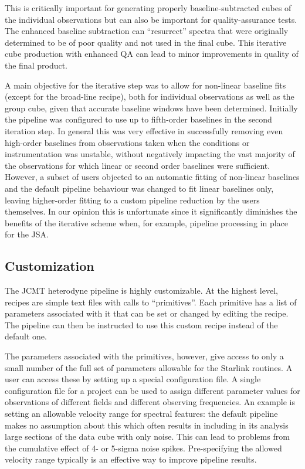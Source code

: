 \documentclass[useAMS,usenatbib]{mn2e}
\begin{document}
This is critically important for generating properly baseline-subtracted
cubes of the individual observations but can also
be important for quality-assurance tests. The enhanced baseline
subtraction can ``resurrect'' spectra that were originally determined
to be of poor quality and not used in the final cube. This iterative
cube production with enhanced QA can lead to minor improvements in
quality of the final product.

A main objective for the iterative step was to allow for non-linear baseline fits
(except for the broad-line recipe), both for individual observations as well as
the group cube, given that accurate baseline windows have been determined.
Initially the pipeline was configured to use up to fifth-order baselines in
the second iteration step. In general this was very effective in successfully
removing even high-order baselines from observations taken when the
conditions or instrumentation was unstable, without negatively impacting
the vast majority of the observations for which linear or second order baselines
were sufficient.  However, a subset of users objected to an automatic fitting of
non-linear baselines and the default pipeline behaviour was changed to
fit linear baselines only, leaving higher-order fitting to a custom pipeline reduction
by the users themselves.  In our opinion this is unfortunate since it significantly
diminishes the benefits of the iterative scheme when, for example, pipeline processing
in place for the JSA.

\subsection{Customization}

The JCMT heterodyne pipeline is highly customizable. At the highest level, recipes
are simple text files with calls to ``primitives''. Each primitive has a list of
parameters associated with it that can be set or changed by editing the recipe.
The pipeline can then be instructed to use this custom recipe instead of the default one.

The parameters associated with the primitives, however, give access to only a small
number of the full set of parameters allowable for the Starlink routines. A user can access
these by setting up a special configuration file. A single configuration file for a project can
be used to assign different parameter values for observations of different fields and
different observing frequencies. An example is setting an allowable velocity range for
spectral features: the default pipeline makes no assumption about this which often results
in including in its analysis large sections of the data cube with only noise. This can lead
to problems from the cumulative effect of 4- or 5-sigma noise spikes. Pre-specifying the
allowed velocity range typically is an effective way to improve pipeline results.
\end{document}
